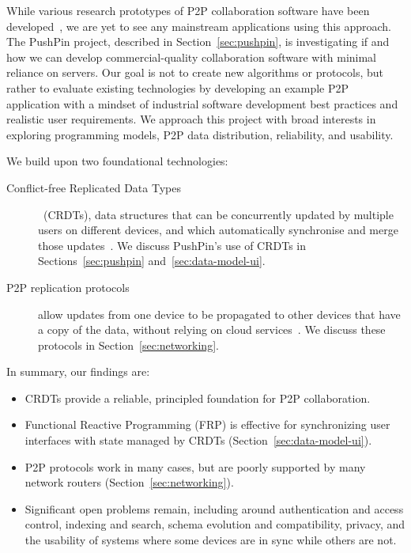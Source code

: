 \documentclass[sigplan,10pt]{acmart}
\begin{document}
While various research prototypes of P2P collaboration software have been developed~\cite{Nedelec:2016eo,vanderLinde:2017fu,Nicolaescu:2016ei}, we are yet to see any mainstream applications using this approach.
The PushPin project, described in Section~\ref{sec:pushpin}, is investigating if and how we can develop commercial-quality collaboration software with minimal reliance on servers.
Our goal is not to create new algorithms or protocols, but rather to evaluate existing technologies by developing an example P2P application with a mindset of industrial software development best practices and realistic user requirements.
We approach this project with broad interests in exploring programming models, P2P data distribution, reliability, and usability.

We build upon two foundational technologies:
\begin{description}
\item[Conflict-free Replicated Data Types] ~(CRDTs), data structures that can be concurrently updated by multiple users on different devices, and which automatically synchronise and merge those updates~\cite{Shapiro:2011un,Gomes:2017gy}.
We discuss PushPin's use of CRDTs in Sections~\ref{sec:pushpin} and~\ref{sec:data-model-ui}.
\item[P2P replication protocols] allow updates from one device to be propagated to other devices that have a copy of the data, without relying on cloud services~\cite{Ogden:2018ur,Tarr:2019ba,Guy:1999gy}.
We discuss these protocols in Section~\ref{sec:networking}.
\end{description}

In summary, our findings are:
\begin{itemize}
    \item CRDTs provide a reliable, principled foundation for P2P collaboration.
    \item Functional Reactive Programming (FRP) is effective for synchronizing user interfaces with state managed by CRDTs (Section~\ref{sec:data-model-ui}).
    \item P2P protocols work in many cases, but are poorly supported by many network routers (Section~\ref{sec:networking}).
    \item Significant open problems remain, including around authentication and access control, indexing and search, schema evolution and compatibility, privacy, and the usability of systems where some devices are in sync while others are not.
\end{itemize}
\end{document}
